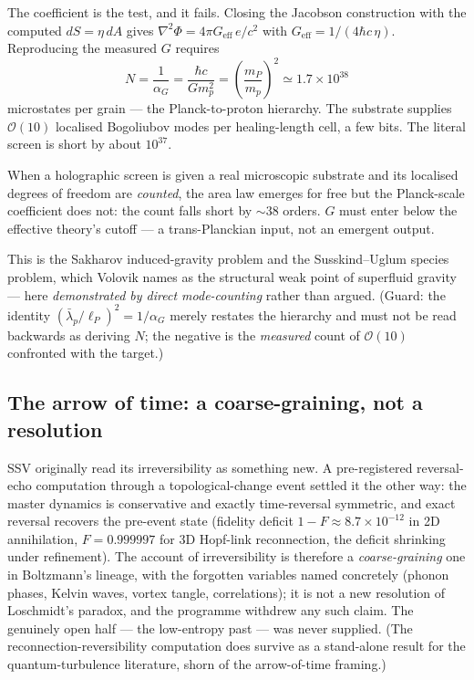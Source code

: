 \documentclass[11pt]{article}
\begin{document}
The coefficient is the test, and it fails. Closing the Jacobson construction with
the computed $dS=\eta\,dA$ gives $\nabla^2\Phi=4\pi G_{\mathrm{eff}}\,e/c^2$ with
$G_{\mathrm{eff}}=1/(4\hbar c\,\eta)$. Reproducing the measured $G$ requires
\begin{equation}
  N=\frac{1}{\alpha_G}=\frac{\hbar c}{G m_p^2}
   =\left(\frac{m_P}{m_p}\right)^2\simeq 1.7\times 10^{38}
\end{equation}
microstates per grain --- the Planck-to-proton hierarchy. The substrate supplies
$\mathcal{O}(10)$ localised Bogoliubov modes per healing-length cell, a few bits.
The literal screen is short by about $10^{37}$.

\begin{resultbox}
\noindent When a holographic screen is given a real microscopic substrate and its
localised degrees of freedom are \emph{counted}, the area law emerges for free but
the Planck-scale coefficient does not: the count falls short by $\sim$38 orders.
$G$ must enter below the effective theory's cutoff --- a trans-Planckian input,
not an emergent output.
\end{resultbox}

\noindent This is the Sakharov induced-gravity problem and the Susskind--Uglum
species problem, which Volovik names as the structural weak point of superfluid
gravity --- here \emph{demonstrated by direct mode-counting} rather than argued.
(Guard: the identity $(\bar{\lambda}_p/\ell_P)^2=1/\alpha_G$ merely restates the hierarchy and
must not be read backwards as deriving $N$; the negative is the \emph{measured}
count of $\mathcal{O}(10)$ confronted with the target.)

\subsection{The arrow of time: a coarse-graining, not a resolution}

SSV originally read its irreversibility as something new. A pre-registered
reversal-echo computation through a topological-change event settled it the other
way: the master dynamics is conservative and exactly time-reversal symmetric, and
exact reversal recovers the pre-event state (fidelity deficit $1-F\approx
8.7\times10^{-12}$ in 2D annihilation, $F=0.999997$ for 3D Hopf-link
reconnection, the deficit shrinking under refinement). The account of
irreversibility is therefore a \emph{coarse-graining} one in Boltzmann's lineage,
with the forgotten variables named concretely (phonon phases, Kelvin waves,
vortex tangle, correlations); it is not a new resolution of Loschmidt's paradox,
and the programme withdrew any such claim. The genuinely open half --- the
low-entropy past --- was never supplied. (The reconnection-reversibility
computation does survive as a stand-alone result for the quantum-turbulence
literature, shorn of the arrow-of-time framing.)
\end{document}
